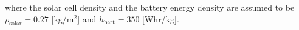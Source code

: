 \documentclass[]{aiaa-tc}%
\begin{document}
where the solar cell density and the battery energy density are assumed to be $\rho_{\text{solar}} = 0.27$ [kg/m$^2$] and $h_{\text{batt}} = 350$ [Whr/kg].\cite{solartech}\cite{solarparam}

% 
% 
% 
% 
\end{document}
